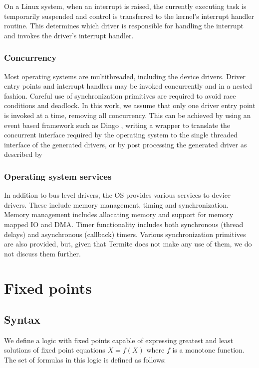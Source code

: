 On a Linux system, when an interrupt is raised, the currently executing task is temporarily suspended and control is transferred to the kernel's interrupt handler routine. This determines which driver is responsible for handling the interrupt and invokes the driver's interrupt handler.

\subsubsection{Concurrency}

Most operating systems are multithreaded, including the device drivers. Driver entry points and interrupt handlers may be invoked concurrently and in a nested fashion. Careful use of synchronization primitives are required to avoid race conditions and deadlock. In this work, we assume that only one driver entry point is invoked at a time, removing all concurrency. This can be achieved by using an event based framework such as Dingo \cite{Ryzhyk_CKH_09}, writing a wrapper to translate the concurrent interface required by the operating system to the single threaded interface of the generated drivers, or by post processing the generated driver as described by \cite{Cerny_HRRT_13}

\subsubsection{Operating system services}

In addition to bus level drivers, the OS provides various services to device drivers. These include memory management, timing and synchronization. Memory management includes allocating memory and support for memory mapped IO and DMA. Timer functionality includes both synchronous (thread delays) and asynchronous (callback) timers. Various synchronization primitives are also provided, but, given that Termite does not make any use of them, we do not discuss them further.

\section{Fixed points}

\subsection{Syntax}

We define a logic with fixed points capable of expressing greatest and least solutions of fixed point equations $X = f(X)$ where $f$ is a monotone function. The set of formulas in this logic is defined as follows:

